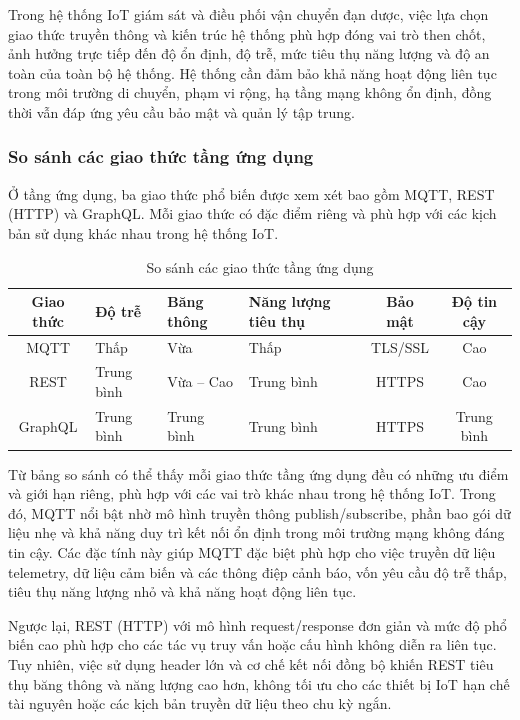 Trong hệ thống IoT giám sát và điều phối vận chuyển đạn dược, việc lựa chọn giao
thức truyền thông và kiến trúc hệ thống phù hợp đóng vai trò then chốt, ảnh hưởng
trực tiếp đến độ ổn định, độ trễ, mức tiêu thụ năng lượng và độ an toàn của toàn
bộ hệ thống. Hệ thống cần đảm bảo khả năng hoạt động liên tục trong môi trường di
chuyển, phạm vi rộng, hạ tầng mạng không ổn định, đồng thời vẫn đáp ứng yêu cầu
bảo mật và quản lý tập trung.

\subsubsection{So sánh các giao thức tầng ứng dụng}

Ở tầng ứng dụng, ba giao thức phổ biến được xem xét bao gồm MQTT, REST (HTTP) và
GraphQL. Mỗi giao thức có đặc điểm riêng và phù hợp với các kịch bản sử dụng khác
nhau trong hệ thống IoT.

\begin{table}[H]
\centering
\begin{tabularx}{\textwidth}{|c|X|X|X|c|c|}
\hline
\textbf{Giao thức} & \textbf{Độ trễ} & \textbf{Băng thông} & \textbf{Năng lượng tiêu thụ} & \textbf{Bảo mật} & \textbf{Độ tin cậy} \\
\hline
MQTT & Thấp & Vừa & Thấp & TLS/SSL & Cao \\
\hline
REST & Trung bình & Vừa -- Cao & Trung bình & HTTPS & Cao \\
\hline
GraphQL & Trung bình & Trung bình & Trung bình & HTTPS & Trung bình \\
\hline
\end{tabularx}
\caption{So sánh các giao thức tầng ứng dụng}
\end{table}

Từ bảng so sánh có thể thấy mỗi giao thức tầng ứng dụng đều có những ưu điểm và
giới hạn riêng, phù hợp với các vai trò khác nhau trong hệ thống IoT. Trong đó,
MQTT nổi bật nhờ mô hình truyền thông publish/subscribe, phần bao gói dữ liệu nhẹ
và khả năng duy trì kết nối ổn định trong môi trường mạng không đáng tin cậy. Các
đặc tính này giúp MQTT đặc biệt phù hợp cho việc truyền dữ liệu telemetry, dữ
liệu cảm biến và các thông điệp cảnh báo, vốn yêu cầu độ trễ thấp, tiêu thụ năng
lượng nhỏ và khả năng hoạt động liên tục.

Ngược lại, REST (HTTP) với mô hình request/response đơn giản và mức độ phổ biến
cao phù hợp cho các tác vụ truy vấn hoặc cấu hình không diễn ra liên tục. Tuy
nhiên, việc sử dụng header lớn và cơ chế kết nối đồng bộ khiến REST tiêu thụ băng
thông và năng lượng cao hơn, không tối ưu cho các thiết bị IoT hạn chế tài nguyên
hoặc các kịch bản truyền dữ liệu theo chu kỳ ngắn.


